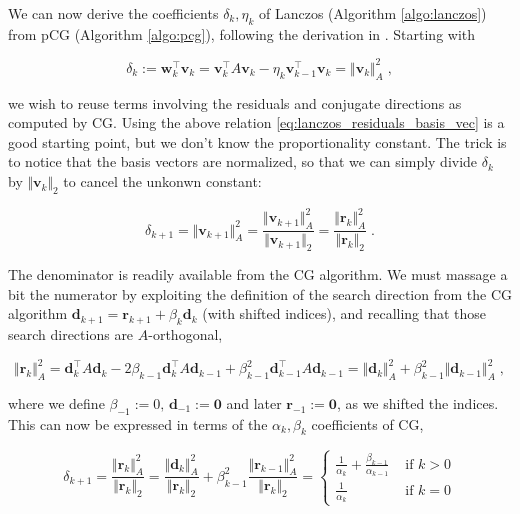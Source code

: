 \documentclass{article}
\newcommand{\vect}[1]{\boldsymbol{\mathbf{#1}}}
\newcommand{\norm}[1]{\Vert #1 \Vert}
\begin{document}
We can now derive the coefficients $\delta_k, \eta_k$ of Lanczos (Algorithm \ref{algo:lanczos}) from pCG (Algorithm \ref{algo:pcg}), following the derivation in \cite[section 6.7.3]{saad_iterative_2003}. Starting with 

\begin{equation*}
    \delta_k := \vect w_k^\top \vect v_k = \vect v_k^\top A \vect v_k - \eta_k \vect v_{k-1}^\top \vect v_k = \norm{\vect v_k}_A^2 \; ,
\end{equation*}

we wish to reuse terms involving the residuals and conjugate directions as computed by CG. Using the above relation \eqref{eq:lanczos_residuals_basis_vec} is a good starting point, but we don't know the proportionality constant. The trick is to notice that the basis vectors are normalized, so that we can simply divide $\delta_k$ by $\norm{\vect v_k}_2$ to cancel the unkonwn constant:

\begin{equation*}
    \delta_{k+1} = \norm{\vect v_{k+1}}_A^2 = \frac{\norm{\vect v_{k+1}}_A^2}{\norm{\vect v_{k+1}}_2} = \frac{\norm{\vect r_{k}}_A^2}{\norm{\vect r_k}_2} \; .
\end{equation*}

The denominator is readily available from the CG algorithm. We must massage a bit the numerator by exploiting the definition of the search direction from the CG algorithm $\vect d_{k+1} = \vect r_{k+1} + \beta_k \vect d_k$ (with shifted indices), and recalling that those search directions are $A$-orthogonal,

\begin{equation*}
    \norm{\vect r_{k}}_A^2 = \vect d_k^\top A \vect d_k - 2 \beta_{k-1} \vect d_k^\top A \vect d_{k-1} + \beta_{k-1}^2 \vect d_{k-1}^\top A \vect d_{k-1} = \norm{\vect d_{k}}_A^2 + \beta_{k-1}^2 \norm{\vect d_{k-1}}_A^2 \; ,
\end{equation*}

where we define $\beta_{-1}:= 0, \, \vect d_{-1} := \vect0$ and later $\vect r_{-1} := \vect 0$, as we shifted the indices. This can now be expressed in terms of the $\alpha_k, \beta_k$ coefficients of CG, 

\begin{equation*}
    \delta_{k+1} = \frac{\norm{\vect r_{k}}_A^2}{\norm{\vect r_k}_2} = \frac{\norm{\vect d_{k}}_A^2}{\norm{\vect r_k}_2} + \beta_{k-1}^2 \frac{\norm{\vect r_{k-1}}_A^2}{\norm{\vect r_k}_2} = \begin{cases}
    \frac {1}{\alpha_k} + \frac{\beta_{k-1}}{\alpha_{k-1}} & \text{ if } k > 0\\
    \frac {1}{\alpha_k} & \text{ if } k = 0
    \end{cases}
\end{equation*}
\end{document}
